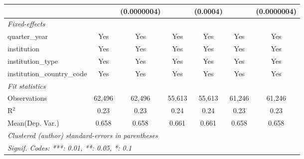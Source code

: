 \begin{tabular}{lcccccc}
                                      &               & (0.0000004)   &               & (0.0004)      &               & (0.0000004)\\   
   \midrule
   \emph{Fixed-effects}\\
   quarter\_year                      & Yes           & Yes           & Yes           & Yes           & Yes           & Yes\\  
   institution                        & Yes           & Yes           & Yes           & Yes           & Yes           & Yes\\  
   institution\_type                  & Yes           & Yes           & Yes           & Yes           & Yes           & Yes\\  
   institution\_country\_code         & Yes           & Yes           & Yes           & Yes           & Yes           & Yes\\  
   \midrule
   \emph{Fit statistics}\\
   Observations                       & 62,496        & 62,496        & 55,613        & 55,613        & 61,246        & 61,246\\  
   R$^2$                              & 0.23          & 0.23          & 0.24          & 0.24          & 0.23          & 0.23\\  
Mean(Dep. Var.) & 0.658 & 0.658 & 0.661 & 0.661 & 0.658 & 0.658 \\
   \midrule \midrule
   \multicolumn{7}{l}{\emph{Clustered (author) standard-errors in parentheses}}\\
   \multicolumn{7}{l}{\emph{Signif. Codes: ***: 0.01, **: 0.05, *: 0.1}}\\
\end{tabular}
\par\endgroup
